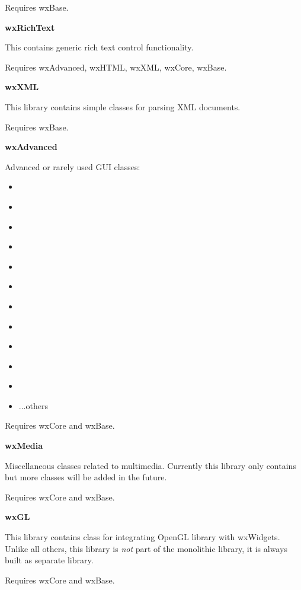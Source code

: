 Requires wxBase.

{\large {\bf wxRichText}}

This contains generic rich text control functionality.

Requires wxAdvanced, wxHTML, wxXML, wxCore, wxBase.

{\large {\bf wxXML}}

This library contains simple classes for parsing XML documents.

Requires wxBase.

{\large {\bf wxAdvanced}}

Advanced or rarely used GUI classes:

\begin{itemize}\itemsep=0pt
\item{  }
\item{  }
\item{  }
\item{  }
\item{  }
\item{  }
\item{  }
\item{  }
\item{  }
\item{  }
\item{  }
\item{ ...others }
\end{itemize}

Requires wxCore and wxBase.

{\large {\bf wxMedia}}

Miscellaneous classes related to multimedia. Currently this library only
contains  but more classes will be added in
the future.

Requires wxCore and wxBase.

{\large {\bf wxGL}}

This library contains  class for integrating
OpenGL library with wxWidgets. Unlike all others, this library is {\em not}
 part of the monolithic library, it is always built as separate library.

Requires wxCore and wxBase.

